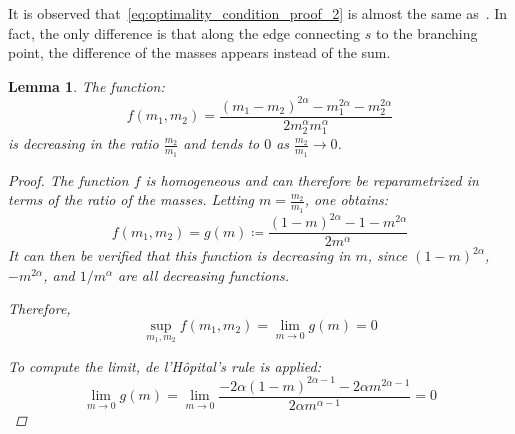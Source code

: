 \documentclass[12pt,a4paper]{article}
\numberwithin{equation}{section}
\theoremstyle{mytheorem}
\newtheorem{lemma}[subsection]{Lemma}
\theoremstyle{myremark}
\theoremstyle{myparagraph}
\begin{document}
        It is observed that~\ref{eq:optimality_condition_proof_2} is almost the same as~\cite[Lemma 12.2]{Bernot}.
    In fact, the only difference is that along the edge connecting $s$ to the branching point, the difference
    of the masses appears instead of the sum.

    \begin{lemma}
        \label{lemma:difference_bound_decreasing}
        The function:
        \begin{equation}
            f(m_1, m_2) = \frac{(m_1 - m_2) ^ {2\alpha} - m_1^{2\alpha} - m_2^{2\alpha}}{2m_2^\alpha m_1^\alpha}
        \end{equation}
        is decreasing in the ratio $\frac{m_2}{m_1}$ and tends to $0$ as $\frac{m_2}{m_1} \rightarrow 0$.

        \begin{proof}
            The function $f$ is homogeneous and can therefore be reparametrized in terms of the ratio of the masses. Letting $m = \frac{m_2}{m_1}$,
            one obtains:
            \begin{equation}
                f(m_1, m_2) = g(m) \coloneqq \frac{(1 - m) ^ {2\alpha} - 1 - m^{2\alpha}}{2m^\alpha}
            \end{equation}
            It can then be verified that this function is decreasing in $m$, since $(1-m)^{2\alpha}$, $-m^{2\alpha}$,
            and $1/ m^\alpha$ are all decreasing functions.

            Therefore,
            \begin{equation}
                \sup_{m_1, m_2} f(m_1,m_2) = \lim_{m \rightarrow 0} g(m) = 0
            \end{equation}

            To compute the limit, de l'Hôpital's rule is applied:
            \begin{equation}
                \lim_{m \rightarrow 0} g(m) = \lim_{m \rightarrow 0} \frac{-2\alpha (1-m)^{2\alpha-1} - 2\alpha m^{2\alpha-1}}{2\alpha m^{\alpha-1}} = 0
            \end{equation}
        \end{proof}

    \end{lemma}
\end{document}
